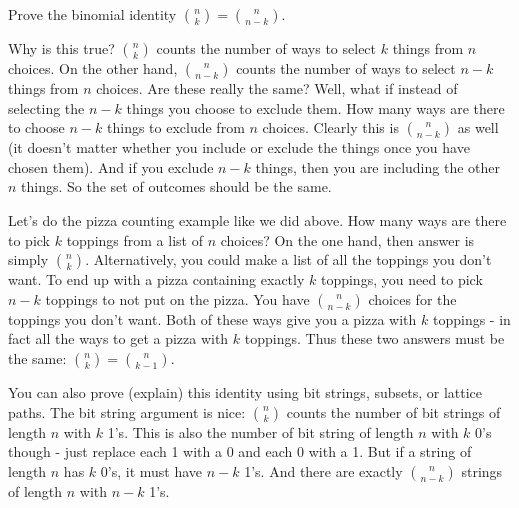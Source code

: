 \documentclass[12pt]{article}
\begin{document}
\begin{example}
  Prove the binomial identity ${n \choose k} = {n \choose n-k}$.
  \begin{solution}
    Why is this true?  ${n \choose k}$ counts the number of ways to select $k$ things from $n$ choices.  On the other hand, ${n \choose n-k}$ counts the number of ways to select $n-k$ things from $n$ choices.  Are these really the same?  Well, what if instead of selecting the $n-k$ things you choose to exclude them.  How many ways are there to choose $n-k$ things to exclude from $n$ choices.  Clearly this is ${n \choose n-k}$ as well (it doesn't matter whether you include or exclude the things once you have chosen them).  And if you exclude $n-k$ things, then you are including the other $n$ things.  So the set of outcomes should be the same.
    
    Let's do the pizza counting example like we did above.  How many ways are there to pick $k$ toppings from a list of $n$ choices?  On the one hand, then answer is simply ${n \choose k}$.  Alternatively, you could make a list of all the toppings you don't want.  To end up with a pizza containing exactly $k$ toppings, you need to pick $n-k$ toppings to not put on the pizza.  You have ${n \choose n-k}$ choices for the toppings you don't want. Both of these ways give you a pizza with $k$ toppings - in fact all the ways to get a pizza with $k$ toppings.  Thus  these two answers must be the same: ${n \choose k} = {n \choose k-1}$.
    
    You can also prove (explain) this identity using bit strings, subsets, or lattice paths.  The bit string argument is nice: ${n \choose k}$ counts the number of bit strings of length $n$ with $k$ 1's.  This is also the number of bit string of length $n$ with $k$ 0's though - just replace each 1 with a 0 and each 0 with a 1.  But if a string of length $n$ has $k$ 0's, it must have $n-k$ 1's.  And there are exactly ${n\choose n-k}$ strings of length $n$ with $n-k$ 1's.
  \end{solution}
\end{example}
\end{document}
